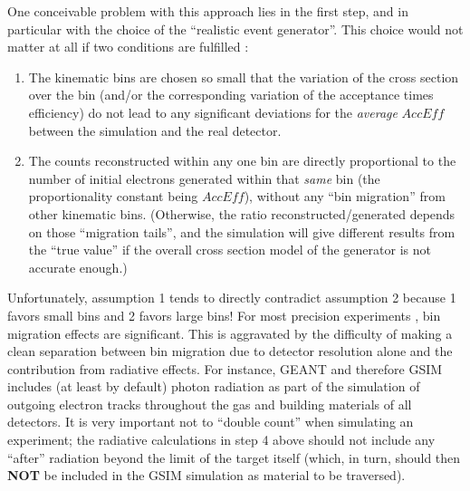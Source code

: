One conceivable problem with this approach lies in the first step, and in particular with the choice of the
``realistic event generator''. This choice would not matter at all if two conditions are fulfilled \cite{KuhnEG4ana}:
\begin{enumerate}
\item The kinematic bins are chosen so small that the variation of the cross section over the bin (and/or the
corresponding variation of the acceptance times efficiency) do not lead to any significant deviations for
the {\em average} $Acc Eff$ between the simulation and the real detector. %
\item The counts reconstructed within any one bin are directly proportional to the number of initial electrons generated
within that {\em same} bin (the proportionality constant being $Acc Eff$), without any ``bin migration'' from other 
kinematic bins. (Otherwise, the ratio reconstructed/generated depends on those ``migration tails'', and the simulation
will give different results from the ``true value'' if the overall cross section model of the generator is not accurate enough.)
\end{enumerate}

Unfortunately, assumption 1 tends to directly contradict assumption 2 because 1 favors small bins and 2 favors large bins!  For most precision experiments %
, bin migration effects are significant. This is aggravated by the difficulty of making %
a clean separation between bin migration due to detector resolution alone and the contribution from radiative effects. For instance, GEANT and therefore GSIM includes (at least by default) photon radiation as part of the simulation of outgoing electron tracks throughout the gas and building materials of all detectors. It is very important not to ``double count'' when simulating an experiment; the radiative calculations in step 4 above should not include any ``after'' radiation beyond the limit of the target itself (which, in turn, should then {\bf NOT} be included in the GSIM simulation as material to be traversed).

